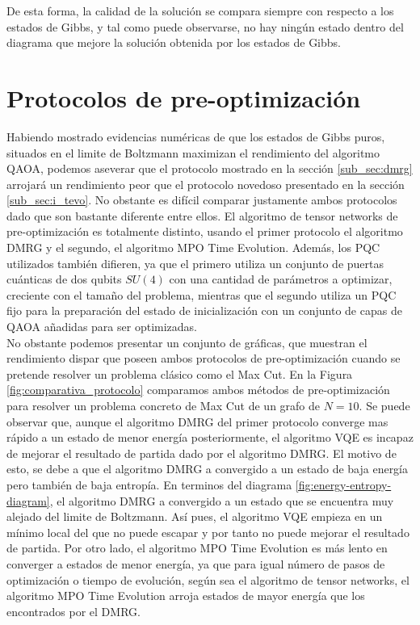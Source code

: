 \newpage

De esta forma, la calidad de la solución se compara siempre con respecto a los estados de Gibbs, y tal como puede observarse, no hay ningún estado dentro del diagrama que mejore la solución obtenida por los estados de Gibbs.

\section{Protocolos de pre-optimización}

Habiendo mostrado evidencias numéricas de que los estados de Gibbs puros, situados en el limite de Boltzmann maximizan el rendimiento del algoritmo QAOA, podemos aseverar que el protocolo mostrado en la sección \ref{sub_sec:dmrg} arrojará un rendimiento peor que el protocolo novedoso presentado en la sección \ref{sub_sec:i_tevo}. No obstante es difícil comparar justamente ambos protocolos dado que son bastante diferente entre ellos. El algoritmo de tensor networks de pre-optimización es totalmente distinto, usando el primer protocolo el algoritmo DMRG y el segundo, el algoritmo MPO Time Evolution. Además, los \mbox{PQC} utilizados también difieren, ya que el primero utiliza un conjunto de puertas cuánticas de dos qubits $SU(4)$ con una cantidad de parámetros a optimizar, creciente con el tamaño del problema, mientras que el segundo utiliza un \mbox{PQC} fijo para la preparación del estado de inicialización con un conjunto de capas de QAOA añadidas para ser optimizadas. \\

No obstante podemos presentar un conjunto de gráficas, que muestran el rendimiento dispar que poseen ambos protocolos de pre-optimización cuando se pretende resolver un problema clásico como el Max Cut. En la Figura \ref{fig:comparativa_protocolo} comparamos ambos métodos de pre-optimización para resolver un problema concreto de Max Cut de un grafo de $N=10$. Se puede observar que, aunque el algoritmo DMRG del primer protocolo converge mas rápido a un estado de menor energía posteriormente, el algoritmo VQE es incapaz de  mejorar el resultado de partida dado por el algoritmo DMRG. El motivo de esto, se debe a que el algoritmo DMRG a convergido a un estado de baja energía pero también de baja entropía. En terminos del diagrama \ref{fig:energy-entropy-diagram}, el algoritmo DMRG a convergido a un estado que se encuentra muy alejado del limite de Boltzmann. Así pues, el algoritmo VQE empieza en un mínimo local del que no puede escapar y por tanto no puede mejorar el resultado de partida. Por otro lado, el algoritmo MPO Time Evolution es más lento en converger a estados de menor energía, ya que para igual número de pasos de optimización o tiempo de evolución, según sea el algoritmo de tensor networks, el algoritmo MPO Time Evolution arroja estados de mayor energía que los encontrados por el DMRG. 

